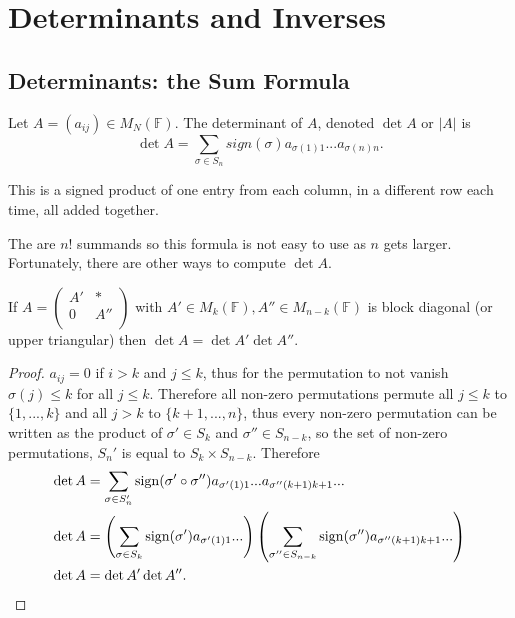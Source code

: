 \section{Determinants and Inverses}
\subsection{Determinants: the Sum Formula}

\begin{definition}
  Let $A = (a_{ij}) \in M_N(\mathbb{F})$. The determinant of $A$, denoted $\det A$ or $|A|$ is
  \[\det A = \sum_{\sigma \in S_n} sign(\sigma) a_{\sigma(1) 1} ... a_{\sigma(n) n}.\]

  This is a signed product of one entry from each column, in a different row each time, all added together.
\end{definition}

\begin{remark}
    The are $n!$ summands so this formula is not easy to use as $n$ gets larger. Fortunately, there are other ways to compute $\det A$.
\end{remark}

\begin{prop}
    If $A = \begin{pmatrix}
    A' & *\\
    0 & A''\\
  \end{pmatrix}$ with $A' \in M_k(\mathbb{F}), A'' \in M_{n - k}(\mathbb{F})$ is block diagonal (or upper triangular) then $\det A = \det A' \det A''$.
\end{prop}
\begin{proof}
  $a_{ij} = 0$ if $i > k$ and $j \leq k$, thus for the permutation to not vanish $\sigma(j) \leq k$ for all $j \leq k$. Therefore all non-zero permutations permute all $j \leq k$ to $\{1,...,k\}$ and all $j > k$ to $\{k+1,...,n\}$, thus every non-zero permutation can be written as the product of $\sigma' \in S_k$ and $\sigma'' \in S_{n-k}$, so the set of non-zero permutations, $S_n'$ is equal to $S_k \times S_{n - k}$. Therefore
  \begin{align*}
    \det A &= \sum_{ \sigma \in S_n'} \operatorname{sign} (\sigma' \circ \sigma'') a_{\sigma'(1) 1} ... a_{\sigma''(k+1) k +1} ... \\
    \det A &= \left(\sum_{ \sigma \in S_k} \operatorname{sign} (\sigma') a_{\sigma'(1) 1} ...\right) \left( \sum_{ \sigma'' \in S_{n - k}}  \operatorname{sign} (\sigma'') a_{\sigma''(k+1) k +1} ...\right) \\
    \det A &= \det A' \det A''
  .\end{align*}
\end{proof}

